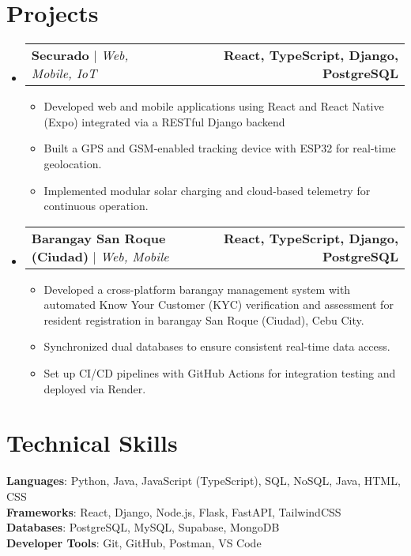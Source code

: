 \documentclass[letterpaper,11pt]{article}
\makeatletter
\newcommand{\resumeItem}[1]{
  \item\small{
    {#1 \vspace{0pt}}
  }
}
\newcommand{\resumeProjectHeading}[2]{
    \item
    \begin{tabular*}{1.001\textwidth}{l@{\extracolsep{\fill}}r}
      \small#1 & \textbf{\small #2}\\
    \end{tabular*}\vspace{-7pt}
}
\newcommand{\resumeSubHeadingListStart}{\begin{itemize}[leftmargin=0.0in, label={}]}
\newcommand{\resumeSubHeadingListEnd}{\end{itemize}}\vspace{0pt}
\newcommand{\resumeItemListStart}{\begin{itemize}}
\newcommand{\resumeItemListEnd}{\end{itemize}\vspace{-5pt}}
\makeatother
\begin{document}
\section{Projects} 
    \vspace{-5pt}
    \resumeSubHeadingListStart
    \resumeProjectHeading{\textbf{Securado} $|$ \emph{Web, Mobile, IoT}}{React, TypeScript, Django, PostgreSQL}
      \resumeItemListStart
        \resumeItem{Developed web and mobile applications using React and React Native (Expo) integrated via a RESTful Django backend}
        \resumeItem{Built a GPS and GSM-enabled tracking device with ESP32 for real-time geolocation.}
        \resumeItem{Implemented modular solar charging and cloud-based telemetry for continuous operation.}
      \resumeItemListEnd
    \vspace{-20pt}
    \resumeProjectHeading
      {\textbf{Barangay San Roque (Ciudad)} $|$ \emph{Web, Mobile}}{React, TypeScript, Django, PostgreSQL}
      \resumeItemListStart
        \resumeItem{Developed a cross-platform barangay management system with automated Know Your Customer (KYC) verification and assessment for resident registration in barangay San Roque (Ciudad), Cebu City.}
        \resumeItem{Synchronized dual databases to ensure consistent real-time data access.}
        \resumeItem{Set up CI/CD pipelines with GitHub Actions for integration testing and deployed via Render.}
      \resumeItemListEnd
\resumeSubHeadingListEnd
\vspace{-12pt}

\section{Technical Skills}
 \begin{itemize}[leftmargin=0.15in, label={}]
    \small{\item{   
      \textbf{Languages}{: Python, Java, JavaScript (TypeScript), SQL, NoSQL, Java, HTML, CSS} \\[1mm]
      \textbf{Frameworks}{: React, Django, Node.js, Flask, FastAPI, TailwindCSS} \\[1mm]
      \textbf{Databases}{: PostgreSQL, MySQL, Supabase, MongoDB} \\[1mm]
      \textbf{Developer Tools}{: Git, GitHub, Postman, VS Code}
    }}
 \end{itemize}
 \vspace{-16pt}
 \vspace{3pt}
\vspace{10pt}

\vspace{-15pt}
\end{document}
